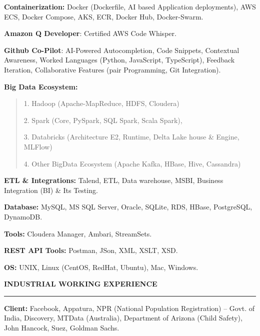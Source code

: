 \documentclass[a4paper]{article}
\begin{document}
\textbf{Containerization:} Docker (Dockerfile, AI based Application
deployments), AWS ECS, Docker Compose, AKS, ECR, Docker Hub,
Docker-Swarm.

\textbf{Amazon Q Developer}: Certified AWS Code Whisper.

\textbf{Github Co-Pilot}: AI-Powered Autocompletion, Code Snippets,
Contextual Awareness, Worked Languages (Python, JavaScript, TypeScript),
Feedback Iteration, Collaborative Features (pair Programming, Git
Integration).

\textbf{Big Data Ecosystem:}

\begin{quote}
1. Hadoop (Apache-MapReduce, HDFS, Cloudera)

2. Spark (Core, PySpark, SQL Spark, Scala Spark),

3. Databricks (Architecture E2, Runtime, Delta Lake house \& Engine,
MLFlow)

4. Other BigData Ecosystem (Apache Kafka, HBase, Hive, Cassandra)
\end{quote}

\textbf{ETL \& Integrations:} Talend, ETL, Data warehouse, MSBI,
Business Integration (BI) \& Its Testing.

\textbf{Database:} MySQL, MS SQL Server, Oracle, SQLite, RDS, HBase,
PostgreSQL, DynamoDB.

\textbf{Tools:} Cloudera Manager, Ambari, StreamSets.

\textbf{REST API Tools:} Postman, JSon, XML, XSLT, XSD.

\textbf{OS:} UNIX, Linux (CentOS, RedHat, Ubuntu), Mac, Windows.

\begin{center}
  \textbf{INDUSTRIAL WORKING EXPERIENCE}
  \rule{\textwidth}{0.4pt}  %
\end{center}

\textbf{Client:} Facebook, Appatura, NPR (National Population
Registration) -- Govt. of India, Discovery, MTData (Australia),
Department of Arizona (Child Safety), John Hancock, Suez, Goldman Sachs.
\end{document}
